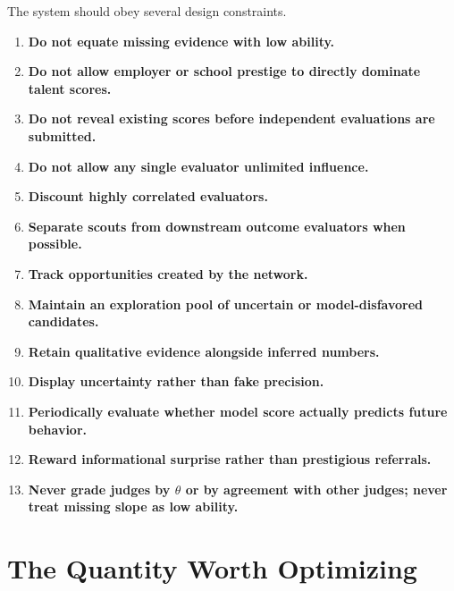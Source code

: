 \documentclass[11pt]{article}
\begin{document}
The system should obey several design constraints.

\begin{enumerate}
    \item \textbf{Do not equate missing evidence with low ability.}

    \item \textbf{Do not allow employer or school prestige to directly dominate talent scores.}

    \item \textbf{Do not reveal existing scores before independent evaluations are submitted.}

    \item \textbf{Do not allow any single evaluator unlimited influence.}

    \item \textbf{Discount highly correlated evaluators.}

    \item \textbf{Separate scouts from downstream outcome evaluators when possible.}

    \item \textbf{Track opportunities created by the network.}

    \item \textbf{Maintain an exploration pool of uncertain or model-disfavored candidates.}

    \item \textbf{Retain qualitative evidence alongside inferred numbers.}

    \item \textbf{Display uncertainty rather than fake precision.}

    \item \textbf{Periodically evaluate whether model score actually predicts future behavior.}

    \item \textbf{Reward informational surprise rather than prestigious referrals.}

    \item \textbf{Never grade judges by \(\theta\) or by agreement with other
    judges; never treat missing slope as low ability.}
\end{enumerate}

\section{The Quantity Worth Optimizing}
\end{document}
